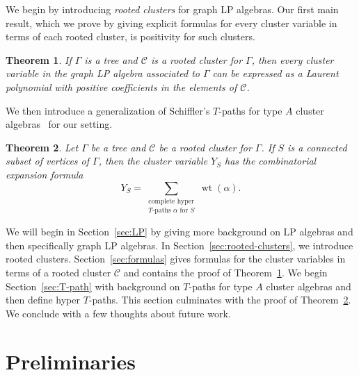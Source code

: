 \documentclass[pdftex]{sigma}
\numberwithin{equation}{section}
\newtheorem{Theorem}{Theorem}[section]
\DeclareMathOperator{\wt}{wt}
\newcommand{\calC}{\mathcal{C}}
\begin{document}
We begin by introducing \emph{rooted clusters} for graph LP algebras. Our first main result, which we prove by giving explicit formulas for every cluster variable in terms of each rooted cluster, is positivity for such clusters.
\begin{Theorem}\label{thm:main1}
If $\Gamma$ is a tree and $\calC$ is a rooted cluster for $\Gamma$, then every cluster variable in the graph LP algebra associated to $\Gamma$ can be expressed as a Laurent polynomial with positive coefficients in the elements of $\calC$.
\end{Theorem}
We then introduce a generalization of Schiffler's $T$-paths for type $A$ cluster algebras~\cite{S-08} for our setting.
\begin{Theorem}
\label{thm:main2}
Let $\Gamma$ be a tree and $\calC$ be a rooted cluster for $\Gamma$. If $S$ is a connected subset of vertices of $\Gamma$, then the cluster variable $Y_S$ has the combinatorial expansion formula \[Y_S=\sum_{\substack{\text{complete hyper}\\T\text{-paths }\alpha\text{ for }S}}\wt(\alpha).\]
\end{Theorem}
We will begin in Section~\ref{sec:LP} by giving more background on LP algebras and then specifically graph LP algebras. In Section~\ref{sec:rooted-clusters}, we introduce rooted clusters. Section~\ref{sec:formulas} gives formulas for the cluster variables in terms of a rooted cluster $\calC$ and contains the proof of Theorem~\ref{thm:main1}. We begin Section~\ref{sec:T-path} with background on $T$-paths for type $A$ cluster algebras and then define hyper $T$-paths. This section culminates with the proof of Theorem~\ref{thm:main2}. We conclude with a few thoughts about future work.
\section{Preliminaries}\label{sec:prelim}
\end{document}
